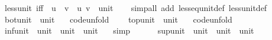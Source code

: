 \begin{isabellebody}
\isanewline
{}\isamarkupfalse%
\ less{\isacharunderscore}{\kern0pt}unit\ {\isacharbrackleft}{\kern0pt}iff{\isacharbrackright}{\kern0pt}{\isacharcolon}{\kern0pt}\ {\isachardoublequoteopen}{\isasymnot}\ u\ {\isacharless}{\kern0pt}\ v{\isachardoublequoteclose}\ \ u\ v\ {\isacharcolon}{\kern0pt}{\isacharcolon}{\kern0pt}\ unit\isanewline
%
\isadelimproof
\ \ %
\endisadelimproof
%
\isatagproof
{}\isamarkupfalse%
\ {\isacharparenleft}{\kern0pt}simp{\isacharunderscore}{\kern0pt}all\ add{\isacharcolon}{\kern0pt}\ less{\isacharunderscore}{\kern0pt}eq{\isacharunderscore}{\kern0pt}unit{\isacharunderscore}{\kern0pt}def\ less{\isacharunderscore}{\kern0pt}unit{\isacharunderscore}{\kern0pt}def{\isacharparenright}{\kern0pt}%
\endisatagproof
{\isafoldproof}%
%
\isadelimproof
\isanewline
%
\endisadelimproof
\isanewline
{}\isamarkupfalse%
\ bot{\isacharunderscore}{\kern0pt}unit\ {\isacharcolon}{\kern0pt}{\isacharcolon}{\kern0pt}\ unit\isanewline
\ \ \ {\isacharbrackleft}{\kern0pt}code{\isacharunderscore}{\kern0pt}unfold{\isacharbrackright}{\kern0pt}{\isacharcolon}{\kern0pt}\ {\isachardoublequoteopen}{\isasymbottom}\ {\isacharequal}{\kern0pt}\ {\isacharparenleft}{\kern0pt}{\isacharparenright}{\kern0pt}{\isachardoublequoteclose}\isanewline
\isanewline
{}\isamarkupfalse%
\ top{\isacharunderscore}{\kern0pt}unit\ {\isacharcolon}{\kern0pt}{\isacharcolon}{\kern0pt}\ unit\isanewline
\ \ \ {\isacharbrackleft}{\kern0pt}code{\isacharunderscore}{\kern0pt}unfold{\isacharbrackright}{\kern0pt}{\isacharcolon}{\kern0pt}\ {\isachardoublequoteopen}{\isasymtop}\ {\isacharequal}{\kern0pt}\ {\isacharparenleft}{\kern0pt}{\isacharparenright}{\kern0pt}{\isachardoublequoteclose}\isanewline
\isanewline
{}\isamarkupfalse%
\ inf{\isacharunderscore}{\kern0pt}unit\ {\isacharcolon}{\kern0pt}{\isacharcolon}{\kern0pt}\ {\isachardoublequoteopen}unit\ {\isasymRightarrow}\ unit\ {\isasymRightarrow}\ unit{\isachardoublequoteclose}\isanewline
\ \ \ {\isacharbrackleft}{\kern0pt}simp{\isacharbrackright}{\kern0pt}{\isacharcolon}{\kern0pt}\ {\isachardoublequoteopen}{\isacharunderscore}{\kern0pt}\ {\isasymsqinter}\ {\isacharunderscore}{\kern0pt}\ {\isacharequal}{\kern0pt}\ {\isacharparenleft}{\kern0pt}{\isacharparenright}{\kern0pt}{\isachardoublequoteclose}\isanewline
\isanewline
{}\isamarkupfalse%
\ sup{\isacharunderscore}{\kern0pt}unit\ {\isacharcolon}{\kern0pt}{\isacharcolon}{\kern0pt}\ {\isachardoublequoteopen}unit\ {\isasymRightarrow}\ unit\ {\isasymRightarrow}\ unit{\isachardoublequoteclose}\isanewline

\end{isabellebody}
